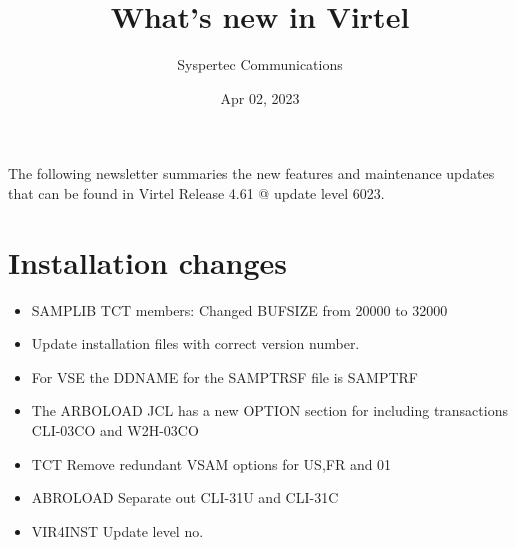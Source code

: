 \documentclass[letterpaper,10pt,english]{sphinxmanual}
\title{What's new in Virtel}
\date{Apr 02, 2023}
\author{Syspertec Communications}
\begin{document}
\pagestyle{empty}
\sphinxmaketitle
\pagestyle{plain}
\sphinxtableofcontents
\pagestyle{normal}
\label{\detokenize{TN202101::doc}}


The following newsletter summaries the new features and maintenance updates that can be found in Virtel Release 4.61 @ update level 6023.


\chapter{Installation changes}
\label{\detokenize{TN202101:installation-changes}}
\begin{itemize}
\item {} 
SAMPLIB TCT members: Changed BUFSIZE from 20000 to 32000

\end{itemize}

\begin{itemize}
\item {} 
Update installation files with correct version number.

\end{itemize}

\begin{itemize}
\item {} 
For VSE the DDNAME for the SAMPTRSF file is SAMPTRF

\end{itemize}

\begin{itemize}
\item {} 
The ARBOLOAD JCL has a new OPTION section for including transactions CLI-03CO and W2H-03CO

\end{itemize}

\begin{itemize}
\item {} 
TCT                           Remove redundant VSAM options for US,FR and 01

\item {} 
ABROLOAD                  Separate out CLI-31U and CLI-31C

\item {} 
VIR4INST                  Update level no.

\end{itemize}
\end{document}
